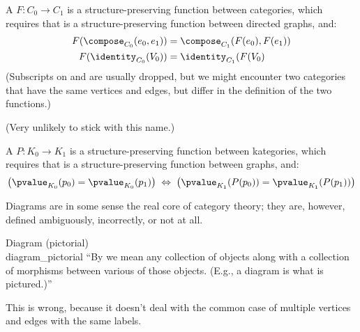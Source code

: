 \documentclass[11pt,openany]{book}
\begin{document}
\begin{definition}
A  $F:C_0 \rightarrow C_1$ is 
a structure-preserving function
between categories, which requires that is a structure-preserving 
function between directed graphs, and:
\begin{align*}
  F(\compose_{C_0}(e_0,e_1)) & = \compose_{C_1}(F(e_0),F(e_1))\\
  F(\identity_{C_0}(V_0)) & = \identity_{C_1}(F(V_0)
\end{align*}
  (Subscripts on \compose and \identity 
  are usually dropped, but we might 
  encounter two categories that have the same vertices and edges,
  but differ in the definition of the two functions.)
\end{definition}

\begin{definition}
(Very unlikely to stick with this name.)

A  $P:K_0 \rightarrow K_1$ is 
a structure-preserving function
between kategories, which requires that is a structure-preserving 
function between graphs, and:
\begin{align*}
  \left( \pvalue_{K_0}(p_0) = \pvalue_{K_0}(p_1) \right)
  \; \Leftrightarrow \; 
  \left( \pvalue_{K_1}(P(p_0)) = \pvalue_{K_1}(P(p_1)) \right)
\end{align*}
\end{definition}

\label{sec:Diagram}

Diagrams are in some sense the real core of category theory;
they are, however, defined ambiguously, incorrectly, or not at all.


\begin{tcbdefinition}
{Diagram (pictorial)\\
\textmd{\textcite{Geroch:1985:MathPhysics,Goldblatt:1984:Topoi,
Hillman:2001:CatPrimer}}}
{diagram_pictorial}
``By  we mean any collection of objects
along with a collection of morphisms between various of those
objects. (E.g., a diagram is what is pictured.)''~\cite{Geroch:1985:MathPhysics} 
\par
This is wrong, because it doesn't deal with the common
case of multiple vertices and edges with the same labels.
\end{tcbdefinition}
\end{document}
